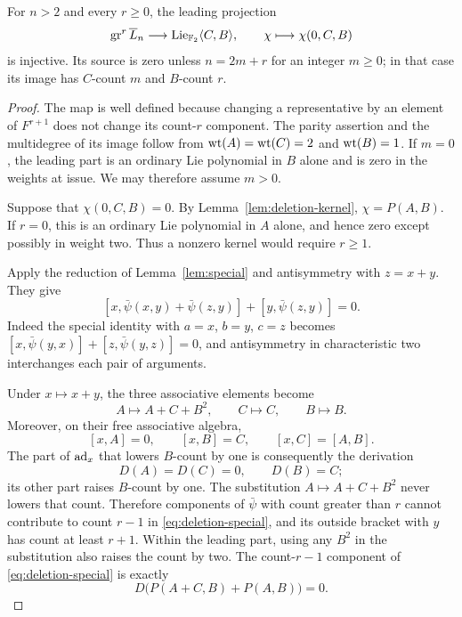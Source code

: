 \begin{proposition}\label{prop:projection-injective}
For $n>2$ and every $r\geq0$, the leading projection
\[
 \operatorname{gr}^{r}\overline L_n\longrightarrow
 \operatorname{Lie}_{{\mathbb F_2}}\langle C,B\rangle,\qquad
 \chi\longmapsto\chi(0,C,B)
\]
is injective.  Its source is zero unless $n=2m+r$ for an integer
$m\geq0$; in that case its image has $C$-count $m$ and $B$-count $r$.
\end{proposition}

\begin{proof}
The map is well defined because changing a representative by an
element of $F^{r+1}$ does not change its count-$r$ component.  The
parity assertion and the multidegree of its image follow from
$\operatorname{wt}(A)=\operatorname{wt}(C)=2$ and $\operatorname{wt}(B)=1$.  If $m=0$, the leading part is an ordinary Lie polynomial
in $B$ alone and is zero in the weights at issue.  We may therefore
assume $m>0$.

Suppose that $\chi(0,C,B)=0$.  By Lemma~\ref{lem:deletion-kernel},
$\chi=P(A,B)$.  If $r=0$, this is an ordinary Lie polynomial in $A$
alone, and hence zero except possibly in weight two.  Thus a nonzero
kernel would require $r\geq1$.

Apply the reduction of Lemma~\ref{lem:special} and antisymmetry with
$z=x+y$.  They give
\begin{equation}\label{eq:deletion-special}
 [x,\bar\psi(x,y)+\bar\psi(z,y)]+[y,\bar\psi(z,y)]=0.
\end{equation}
Indeed the special identity with $a=x$, $b=y$, $c=z$ becomes
$[x,\bar\psi(y,x)]+[z,\bar\psi(y,z)]=0$, and antisymmetry in
characteristic two interchanges each pair of arguments.

Under $x\mapsto x+y$, the three associative elements become
\[
 A\mapsto A+C+B^2,\qquad C\mapsto C,\qquad B\mapsto B.
\]
Moreover, on their free associative algebra,
\[
 [x,A]=0,\qquad [x,B]=C,\qquad [x,C]=[A,B].
\]
The part of $\operatorname{ad}_x$ that lowers $B$-count by one is consequently the
derivation
\[
 D(A)=D(C)=0,\qquad D(B)=C;
\]
its other part raises $B$-count by one.  The substitution
$A\mapsto A+C+B^2$ never lowers that count.  Therefore components of
$\bar\psi$ with count greater than $r$ cannot contribute to count
$r-1$ in \eqref{eq:deletion-special}, and its outside bracket with $y$
has count at least $r+1$.  Within the leading part, using any $B^2$
in the substitution also raises the count by two.  The count-$r-1$
component of \eqref{eq:deletion-special} is exactly
\begin{equation}\label{eq:residual-kernel-identity}
 D\bigl(P(A+C,B)+P(A,B)\bigr)=0.
\end{equation}


\end{proof}
